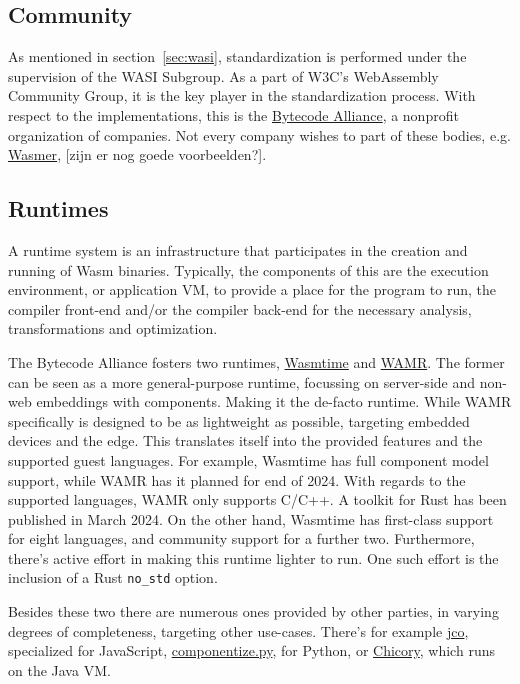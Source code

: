 \subsection{Community}
\label{sec:community}

As mentioned in section~\ref{sec:wasi}, standardization is performed under the supervision of the \gls{WASI} Subgroup. As a part of W3C's WebAssembly Community Group, it is the key player in the standardization process. With respect to the implementations, this is the \href{https://bytecodealliance.org/}{Bytecode Alliance}, a nonprofit organization of companies. Not every company wishes to part of these bodies, e.g. \href{https://wasmer.io/}{Wasmer}, [zijn er nog goede voorbeelden?].

\subsection{Runtimes}
\label{sec:runtimes}

A runtime system is an infrastructure that participates in the creation and running of \gls{Wasm} binaries. Typically, the components of this are the execution environment, or application \gls{VM}, to provide a place for the program to run, the compiler front-end and/or the compiler back-end for the necessary analysis, transformations and optimization.

The Bytecode Alliance fosters two runtimes, \href{https://github.com/bytecodealliance/wasmtime}{Wasmtime} and \href{https://github.com/bytecodealliance/wasm-micro-runtime}{WAMR}. The former can be seen as a more general-purpose runtime, focussing on server-side and non-web embeddings with components. Making it the de-facto runtime. While \gls{WAMR} specifically is designed to be as lightweight as possible, targeting embedded devices and the edge. This translates itself into the provided features and the supported guest languages. For example, Wasmtime has full component model support, while \gls{WAMR} has it planned for end of 2024. With regards to the supported languages, \gls{WAMR} only supports C/C++. A toolkit for Rust has been published in March 2024. On the other hand, Wasmtime has first-class support for eight languages, and community support for a further two. Furthermore, there's active effort in making this runtime lighter to run. One such effort is the inclusion of a Rust \texttt{no\_std} option.

Besides these two there are numerous ones provided by other parties, in varying degrees of completeness, targeting other use-cases. There's for example \href{https://github.com/bytecodealliance/jco}{jco}, specialized for JavaScript, \href{https://github.com/bytecodealliance/componentize-py}{componentize.py}, for Python, or \href{https://github.com/dylibso/chicory}{Chicory}, which runs on the Java \gls{VM}. 

